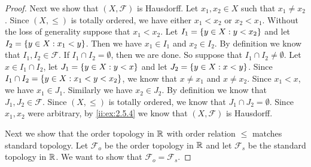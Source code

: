 \begin{proof}
  Next we show that \((X, \mathcal{F})\) is Hausdorff.
  Let \(x_1, x_2 \in X\) such that \(x_1 \neq x_2\).
  Since \((X, \leq)\) is totally ordered, we have either \(x_1 < x_2\) or \(x_2 < x_1\).
  Without the loss of generality suppose that \(x_1 < x_2\).
  Let \(I_1 = \left\lbrace y \in X : y < x_2\right\rbrace\) and let \(I_2 = \left\lbrace y \in X : x_1 < y\right\rbrace\).
  Then we have \(x_1 \in I_1\) and \(x_2 \in I_2\).
  By definition we know that \(I_1, I_2 \in \mathcal{F}\).
  If \(I_1 \cap I_2 = \emptyset\), then we are done.
  So suppose that \(I_1 \cap I_2 \neq \emptyset\).
  Let \(x \in I_1 \cap I_2\), let \(J_1 = \left\lbrace y \in X : y < x\right\rbrace\) and let \(J_2 = \left\lbrace y \in X : x < y\right\rbrace\).
  Since \(I_1 \cap I_2 = \left\lbrace y \in X : x_1 < y < x_2\right\rbrace\), we know that \(x \neq x_1\) and \(x \neq x_2\).
  Since \(x_1 < x\), we have \(x_1 \in J_1\).
  Similarly we have \(x_2 \in J_2\).
  By definition we know that \(J_1, J_2 \in \mathcal{F}\).
  Since \((X, \leq)\) is totally ordered, we know that \(J_1 \cap J_2 = \emptyset\).
  Since \(x_1, x_2\) were arbitrary, by \cref{ii:ex:2.5.4} we know that \((X, \mathcal{F})\) is Hausdorff.

  Next we show that the order topology in \(\mathbb{R}\) with order relation \(\leq\) matches standard topology.
  Let \(\mathcal{F}_o\) be the order topology in \(\mathbb{R}\) and let \(\mathcal{F}_s\) be the standard topology in \(\mathbb{R}\).
  We want to show that \(\mathcal{F}_o = \mathcal{F}_s\).


\end{proof}
